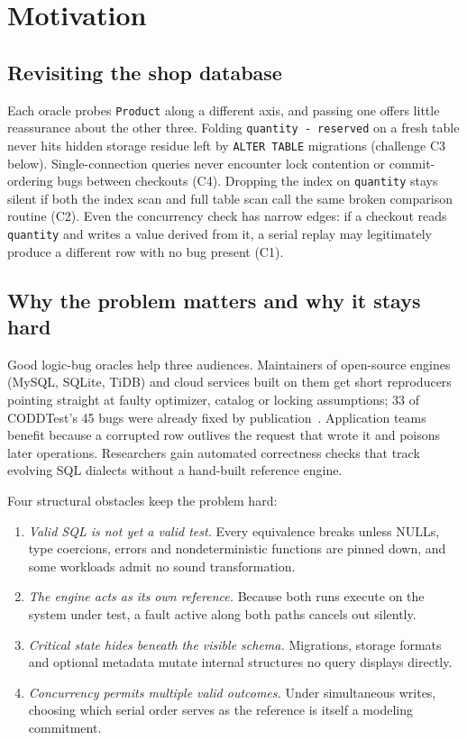 \section{Motivation}\label{sec:motivation}
\subsection{Revisiting the shop database}
Each oracle probes \texttt{Product} along a different axis, and passing one offers little reassurance about the other three. Folding \texttt{quantity - reserved} on a fresh table never hits hidden storage residue left by \texttt{ALTER TABLE} migrations (challenge C3 below). Single-connection queries never encounter lock contention or commit-ordering bugs between checkouts (C4). Dropping the index on \texttt{quantity} stays silent if both the index scan and full table scan call the same broken comparison routine (C2). Even the concurrency check has narrow edges: if a checkout reads \texttt{quantity} and writes a value derived from it, a serial replay may legitimately produce a different row with no bug present (C1).

\subsection{Why the problem matters and why it stays hard}
Good logic-bug oracles help three audiences. Maintainers of open-source engines (MySQL, SQLite, TiDB) and cloud services built on them get short reproducers pointing straight at faulty optimizer, catalog or locking assumptions; 33 of CODDTest's 45 bugs were already fixed by publication~\cite{coddtest}. Application teams benefit because a corrupted row outlives the request that wrote it and poisons later operations. Researchers gain automated correctness checks that track evolving SQL dialects without a hand-built reference engine.

Four structural obstacles keep the problem hard:
\begin{enumerate}[leftmargin=1.6em,itemsep=0pt,topsep=2pt,label=C\arabic*.]
\item \emph{Valid SQL is not yet a valid test.} Every equivalence breaks unless NULLs, type coercions, errors and nondeterministic functions are pinned down, and some workloads admit no sound transformation.
\item \emph{The engine acts as its own reference.} Because both runs execute on the system under test, a fault active along both paths cancels out silently.
\item \emph{Critical state hides beneath the visible schema.} Migrations, storage formats and optional metadata mutate internal structures no query displays directly.
\item \emph{Concurrency permits multiple valid outcomes.} Under simultaneous writes, choosing which serial order serves as the reference is itself a modeling commitment.
\end{enumerate}

